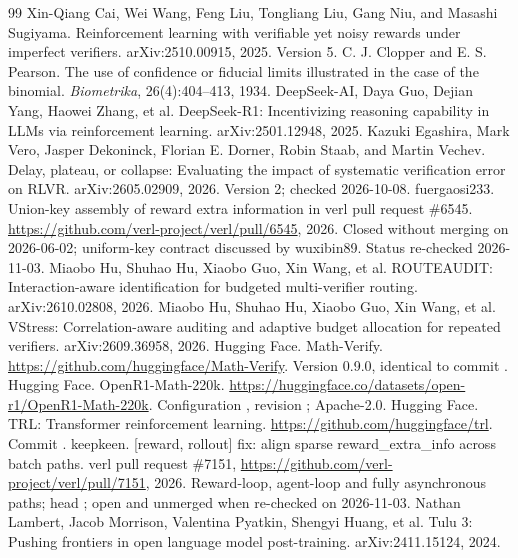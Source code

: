 \documentclass[11pt,a4paper]{article}
\begin{document}
\begin{thebibliography}{99}\small
{} Xin-Qiang Cai, Wei Wang, Feng Liu, Tongliang Liu, Gang Niu, and Masashi Sugiyama. Reinforcement learning with verifiable yet noisy rewards under imperfect verifiers. arXiv:2510.00915, 2025. Version 5.
 C. J. Clopper and E. S. Pearson. The use of confidence or fiducial limits illustrated in the case of the binomial. \emph{Biometrika}, 26(4):404--413, 1934.
 DeepSeek-AI, Daya Guo, Dejian Yang, Haowei Zhang, et al. DeepSeek-R1: Incentivizing reasoning capability in LLMs via reinforcement learning. arXiv:2501.12948, 2025.
 Kazuki Egashira, Mark Vero, Jasper Dekoninck, Florian E. Dorner, Robin Staab, and Martin Vechev. Delay, plateau, or collapse: Evaluating the impact of systematic verification error on RLVR. arXiv:2605.02909, 2026. Version 2; checked 2026-10-08.
 fuergaosi233. Union-key assembly of reward extra information in verl pull request \#6545. \url{https://github.com/verl-project/verl/pull/6545}, 2026. Closed without merging on 2026-06-02; uniform-key contract discussed by wuxibin89. Status re-checked 2026-11-03.
 Miaobo Hu, Shuhao Hu, Xiaobo Guo, Xin Wang, et al. ROUTEAUDIT: Interaction-aware identification for budgeted multi-verifier routing. arXiv:2610.02808, 2026.
 Miaobo Hu, Shuhao Hu, Xiaobo Guo, Xin Wang, et al. VStress: Correlation-aware auditing and adaptive budget allocation for repeated verifiers. arXiv:2609.36958, 2026.
 Hugging Face. Math-Verify. \url{https://github.com/huggingface/Math-Verify}. Version 0.9.0, identical to commit .
 Hugging Face. OpenR1-Math-220k. \url{https://huggingface.co/datasets/open-r1/OpenR1-Math-220k}. Configuration , revision ; Apache-2.0.
 Hugging Face. TRL: Transformer reinforcement learning. \url{https://github.com/huggingface/trl}. Commit .
 keepkeen. [reward, rollout] fix: align sparse reward\_extra\_info across batch paths. verl pull request \#7151, \url{https://github.com/verl-project/verl/pull/7151}, 2026. Reward-loop, agent-loop and fully asynchronous paths; head ; open and unmerged when re-checked on 2026-11-03.
 Nathan Lambert, Jacob Morrison, Valentina Pyatkin, Shengyi Huang, et al. Tulu 3: Pushing frontiers in open language model post-training. arXiv:2411.15124, 2024.

\end{thebibliography}
\end{document}
